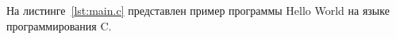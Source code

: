 \documentclass{bmstu}
\begin{document}
На листинге~\ref{lst:main.c} представлен пример программы Hello World на языке программирования C.

	
\end{document}

